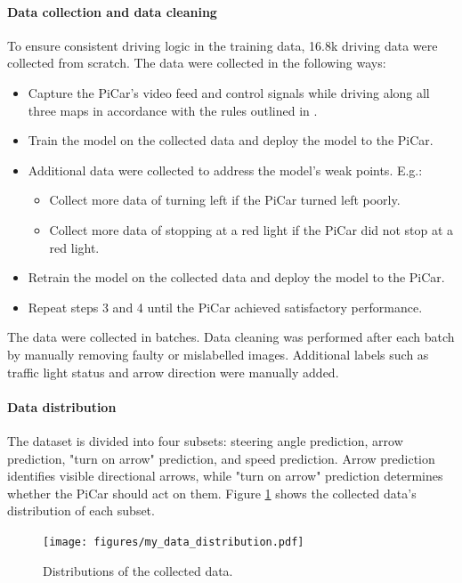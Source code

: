 \documentclass{article}
\begin{document}
\paragraph{Data collection and data cleaning}
To ensure consistent driving logic in the training data, 16.8k driving data were collected from scratch. The data were collected in the following ways:
\begin{itemize}
  \item Capture the PiCar's video feed and control signals while driving along all three maps in accordance with the rules outlined in \citep{Kaggle}.
  \item Train the model on the collected data and deploy the model to the PiCar.
  \item Additional data were collected to address the model's weak points. E.g.:
        \begin{itemize}
          \item Collect more data of turning left if the PiCar turned left poorly.
          \item Collect more data of stopping at a red light if the PiCar did not stop at a red light.
        \end{itemize}
  \item Retrain the model on the collected data and deploy the model to the PiCar.
  \item Repeat steps 3 and 4 until the PiCar achieved satisfactory performance.
\end{itemize}

The data were collected in batches. Data cleaning was performed after each batch by manually removing faulty or mislabelled images. Additional labels such as traffic light status and arrow direction were manually added. 

\paragraph{Data distribution}
The dataset is divided into four subsets: steering angle prediction, arrow prediction, "turn on arrow" prediction, and speed prediction. Arrow prediction identifies visible directional arrows, while "turn on arrow" prediction determines whether the PiCar should act on them. Figure \ref{fig:my_data_distribution} shows the collected data's distribution of each subset.

\begin{figure}[h]
  \centering
  \texttt{[image: figures/my\_data\_distribution.pdf]}
  \caption{Distributions of the collected data.}
  \label{fig:my_data_distribution}
\end{figure}
\end{document}
